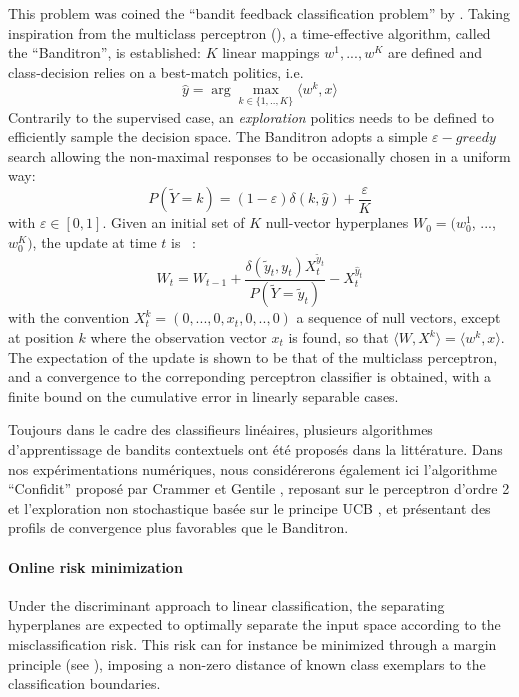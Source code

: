 \documentclass[preprint,12pt,authoryear]{elsarticle}
\begin{document}
This problem was coined the ``bandit feedback classification problem'' by \cite{kakade2008efficient}. Taking inspiration from the multiclass perceptron (\cite{duda1973pattern}), a time-effective algorithm, called the ``Banditron'', is established:
$K$ linear mappings $w^1, ..., w^K$ are defined and class-decision relies on a best-match politics, i.e.
 $$\hat{y} = \arg \max_{k \in\{1,..,K\}}  \langle w^k, x \rangle$$
Contrarily to the supervised case, an \textit{exploration} politics needs to be defined to efficiently sample the decision space. The Banditron adopts a simple  $\varepsilon-greedy$ search allowing the non-maximal responses to be occasionally chosen in a uniform way:
 $$P(\tilde{Y}=k) = (1-\varepsilon) \delta(k,\hat{y}) + \frac{\varepsilon}{K}$$ with $\varepsilon \in [0,1]$.
Given an initial set of $K$ null-vector hyperplanes $W_0 = (w^{1}_0$, ..., $w^{K}_0)$, the update at time $t$ is ~:
$$ W_t = W_{t-1} + \frac{\delta(\tilde{y}_t ,y_t) X_t^{\tilde{y}_t}}{P(\tilde{Y}=\tilde{y}_t)} - X_t^{\hat{y}_t}$$   
with the convention $X_t^k = (0, ..., 0,  x_t, 0, .., 0)$ a sequence of null vectors, except at position $k$ where the observation vector $x_t$ is found, so that $\langle W, X^k\rangle = \langle w^k, x\rangle$. The expectation of the update is shown to be that of the multiclass perceptron, and a convergence to the correponding perceptron classifier is obtained, with a finite bound on the cumulative error in linearly separable cases. 

{\color{blue}
Toujours dans le cadre des classifieurs linéaires, plusieurs algorithmes d'apprentissage de bandits contextuels ont été proposés dans la littérature. Dans nos expérimentations numériques, nous considérerons également ici l'algorithme ``Confidit'' proposé par Crammer et Gentile \cite{crammer2013multiclass}, reposant sur le perceptron d'ordre 2 et l'exploration non stochastique basée sur le principe UCB \cite{lai1985asymptotically}, et présentant des profils de convergence plus favorables que le Banditron. }


\paragraph{Online risk minimization}
Under the discriminant approach to linear classification, the separating hyperplanes are expected to optimally separate the input space according to the misclassification risk. This risk can for instance be minimized through a margin principle (see \cite{vapnik1998statistical}), imposing a non-zero distance of known class exemplars to the classification boundaries. 
\end{document}
